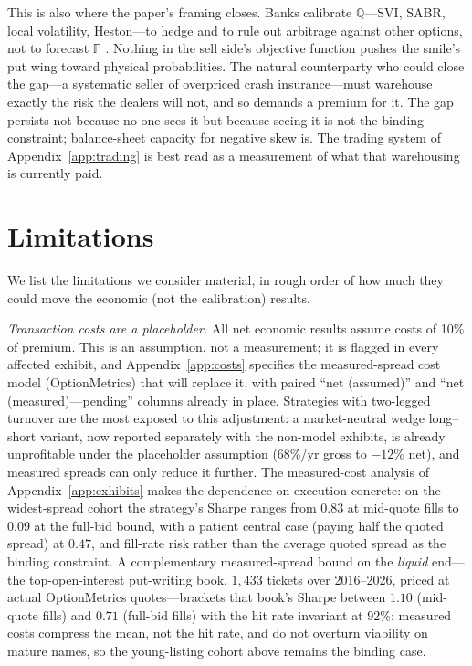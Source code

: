 \documentclass[11pt]{article}
\newcommand{\Q}{\mathbb{Q}}
\newcommand{\PP}{\mathbb{P}}
\begin{document}
This is also where the paper's framing closes. Banks calibrate $\Q$---SVI, SABR, local volatility, Heston---to hedge and to rule out arbitrage against other options, not to forecast $\PP$ \citep{gatheraljacquier2014, hagan2002, dupire1994, heston1993}. Nothing in the sell side's objective function pushes the smile's put wing toward physical probabilities. The natural counterparty who could close the gap---a systematic seller of overpriced crash insurance---must warehouse exactly the risk the dealers will not, and so demands a premium for it. The gap persists not because no one sees it but because seeing it is not the binding constraint; balance-sheet capacity for negative skew is. The trading system of Appendix~\ref{app:trading} is best read as a measurement of what that warehousing is currently paid.

\section{Limitations}\label{sec:limitations}

We list the limitations we consider material, in rough order of how much they could move the economic (not the calibration) results.

\emph{Transaction costs are a placeholder.} All net economic results assume costs of 10\% of premium. This is an assumption, not a measurement; it is flagged in every affected exhibit, and Appendix~\ref{app:costs} specifies the measured-spread cost model (OptionMetrics) that will replace it, with paired ``net (assumed)'' and ``net (measured)---pending'' columns already in place. Strategies with two-legged turnover are the most exposed to this adjustment: a market-neutral wedge long--short variant, now reported separately with the non-model exhibits, is already unprofitable under the placeholder assumption (68\%/yr gross to $-12\%$ net), and measured spreads can only reduce it further. The measured-cost analysis of Appendix~\ref{app:exhibits} makes the dependence on execution concrete: on the widest-spread cohort the strategy's Sharpe ranges from $0.83$ at mid-quote fills to $0.09$ at the full-bid bound, with a patient central case (paying half the quoted spread) at $0.47$, and fill-rate risk rather than the average quoted spread as the binding constraint. A complementary measured-spread bound on the \emph{liquid} end---the top-open-interest put-writing book, $1{,}433$ tickets over 2016--2026, priced at actual OptionMetrics quotes---brackets that book's Sharpe between $1.10$ (mid-quote fills) and $0.71$ (full-bid fills) with the hit rate invariant at $92\%$: measured costs compress the mean, not the hit rate, and do not overturn viability on mature names, so the young-listing cohort above remains the binding case.
\end{document}
